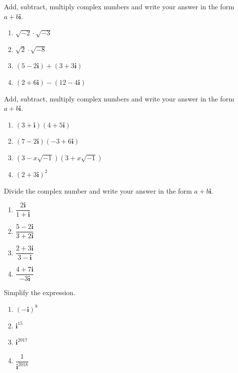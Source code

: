 \documentclass[en,11pt]{elegantbook}
\newcommand{\ii}{\mathbf{i}}
\let\BeginKnitrBlock\begin \let\EndKnitrBlock\end
\begin{document}
\BeginKnitrBlock{exercise}
\protect\hypertarget{exr:unnamed-chunk-105}{}{\label{exr:unnamed-chunk-105} }
Add, subtract, multiply complex numbers and write your answer in the form \(a+b\ii\).

\begin{enumerate}
\def\labelenumi{\arabic{enumi}.}

\item
  \(\sqrt{-2}\cdot\sqrt{-3}\)
\item
  \(\sqrt{2}\cdot\sqrt{-8}\)
\item
  \((5-2\ii)+(3+3\ii)\)
\item
  \((2+6\ii)-(12-4\ii)\)
\end{enumerate}
\EndKnitrBlock{exercise}

\BeginKnitrBlock{exercise}
\protect\hypertarget{exr:unnamed-chunk-106}{}{\label{exr:unnamed-chunk-106} }
Add, subtract, multiply complex numbers and write your answer in the form \(a+b\ii\).

\begin{enumerate}
\def\labelenumi{\arabic{enumi}.}

\item
  \((3+\ii)(4+5\ii)\)
\item
  \((7-2\ii)(-3+6\ii)\)
\item
  \((3-x\sqrt{-1})(3+x\sqrt{-1})\)
\item
  \((2+3\ii)^2\)
\end{enumerate}
\EndKnitrBlock{exercise}

\BeginKnitrBlock{exercise}
\protect\hypertarget{exr:unnamed-chunk-107}{}{\label{exr:unnamed-chunk-107} }
Divide the complex number and write your answer in the form \(a+b\ii\).

\begin{enumerate}
\def\labelenumi{\arabic{enumi}.}

\item
  \(\dfrac{2\ii}{1+\ii}\)
\item
  \(\dfrac{5-2\ii}{3+2\ii}\)
\item
  \(\dfrac{2+3\ii}{3-\ii}\)
\item
  \(\dfrac{4+7\ii}{-3\ii}\)
\end{enumerate}
\EndKnitrBlock{exercise}

\BeginKnitrBlock{exercise}
\protect\hypertarget{exr:unnamed-chunk-108}{}{\label{exr:unnamed-chunk-108} }
Simplify the expression.

\begin{enumerate}
\def\labelenumi{\arabic{enumi}.}

\item
  \((-\ii)^{8}\)
\item
  \(\ii^{15}\)
\item
  \(\ii^{2017}\)
\item
  \(\dfrac1{\ii^{2018}}\)
\end{enumerate}
\EndKnitrBlock{exercise}
\end{document}
